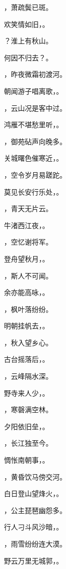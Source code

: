 \documentclass[12pt, a4paper, addpoints]{exam}
\begin{document}
\begin{questions}
\question[3] \fillin，萧疏鬓已斑。

\question[3] 欢笑情如旧，\fillin。

\question[3] \fillin？淮上有秋山。

\question[3] 何因不归去？\fillin。

\question[3] \fillin，昨夜微霜初渡河。

\question[3] 朝闻游子唱离歌，\fillin。

\question[3] \fillin，云山况是客中过。

\question[3] 鸿雁不堪愁里听，\fillin。

\question[3] \fillin，御苑砧声向晚多。

\question[3] 关城曙色催寒近，\fillin。

\question[3] \fillin，空令岁月易蹉跎。

\question[3] 莫见长安行乐处，\fillin。

\question[3] \fillin，青天无片云。

\question[3] 牛渚西江夜，\fillin。

\question[3] \fillin，空忆谢将军。

\question[3] 登舟望秋月，\fillin。

\question[3] \fillin，斯人不可闻。

\question[3] 余亦能高咏，\fillin。

\question[3] \fillin，枫叶落纷纷。

\question[3] 明朝挂帆去，\fillin。

\question[3] \fillin，秋入望乡心。

\question[3] 古台摇落后，\fillin。

\question[3] \fillin，云峰隔水深。

\question[3] 野寺来人少，\fillin。

\question[3] \fillin，寒磬满空林。

\question[3] 夕阳依旧垒，\fillin。

\question[3] \fillin，长江独至今。

\question[3] 惆怅南朝事，\fillin。

\question[3] \fillin，黄昏饮马傍交河。

\question[3] 白日登山望烽火，\fillin。

\question[3] \fillin，公主琵琶幽怨多。

\question[3] 行人刁斗风沙暗，\fillin。

\question[3] \fillin，雨雪纷纷连大漠。

\question[3] 野云万里无城郭，\fillin。


\end{questions}
\end{document}
